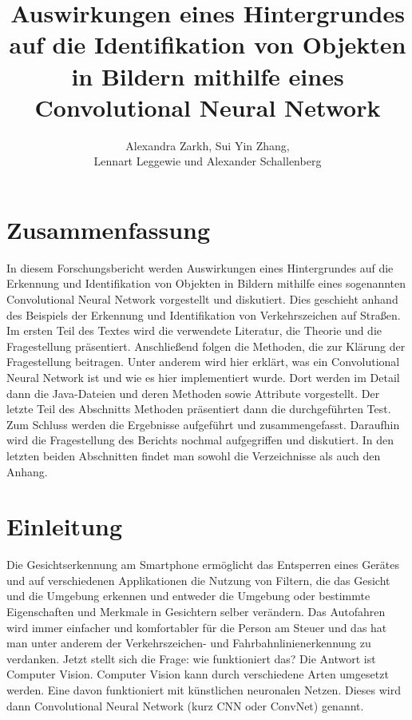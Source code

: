 \documentclass[paper=A4,pagesize=auto,12pt,headinclude=true,footinclude=true,BCOR=0mm,DIV=calc]{scrartcl}
\title{Auswirkungen eines Hintergrundes auf die Identifikation von Objekten in Bildern mithilfe eines Convolutional Neural Network}
\author{Alexandra Zarkh, Sui Yin Zhang,\\ Lennart Leggewie und Alexander Schallenberg}
\newcommand{\sectionspace}{
	\vspace{0.5cm}
}
\begin{document}
\begin{titlepage}
	\maketitle
\end{titlepage}

\tableofcontents
\newpage


\section{Zusammenfassung}\label{sec:Zusammenfassung}
In diesem Forschungsbericht werden Auswirkungen eines Hintergrundes auf die Erkennung und Identifikation von Objekten in Bildern mithilfe eines sogenannten Convolutional Neural Network vorgestellt und diskutiert. Dies geschieht anhand des Beispiels der Erkennung und Identifikation von Verkehrszeichen auf Straßen.
Im ersten Teil des Textes wird die verwendete Literatur, die Theorie und die Fragestellung präsentiert. Anschließend folgen die Methoden, die zur Klärung der Fragestellung beitragen. Unter anderem wird hier erklärt, was ein Convolutional Neural Network ist und wie es hier implementiert wurde. Dort werden im Detail dann die Java-Dateien und deren Methoden sowie Attribute vorgestellt. Der letzte Teil des Abschnitts Methoden präsentiert dann die durchgeführten Test.
Zum Schluss werden die Ergebnisse aufgeführt und zusammengefasst. Daraufhin wird die Fragestellung des Berichts nochmal aufgegriffen und diskutiert. In den letzten beiden Abschnitten findet man sowohl die Verzeichnisse als auch den Anhang.

\sectionspace
\section{Einleitung}\label{sec:Einleitung} %
Die Gesichtserkennung am Smartphone ermöglicht das Entsperren eines Gerätes und auf verschiedenen Applikationen die Nutzung von Filtern, die das Gesicht und die Umgebung erkennen und entweder die Umgebung oder bestimmte Eigenschaften und Merkmale in Gesichtern selber verändern.
Das Autofahren wird immer einfacher und komfortabler für die Person am Steuer und das hat man unter anderem der Verkehrszeichen- und Fahrbahnlinienerkennung zu verdanken. Jetzt stellt sich die Frage: wie funktioniert das? Die Antwort ist Computer Vision. Computer Vision kann durch verschiedene Arten umgesetzt werden. Eine davon funktioniert mit künstlichen neuronalen Netzen. Dieses wird dann Convolutional Neural Network (kurz CNN oder ConvNet) genannt.
\end{document}
